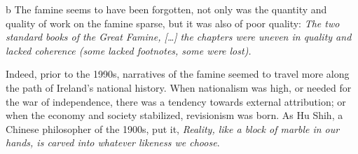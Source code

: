 \begin{table}[h]
\begin{threeparttable}
\begin{tablenotes}
			\vspace{7pt}

			\item[b] The famine seems to have been forgotten, not only was the quantity and quality of work on the famine sparse, but it was also of poor quality: \textit{The two standard books of the Great Famine, [\ldots] the chapters were uneven in quality and lacked coherence (some lacked footnotes, some were lost).} \citep{kinealy2017great}
		\end{tablenotes}
	\end{threeparttable}
\end{table}
\newpage
Indeed, prior to the 1990s, narratives of the famine seemed to travel more along the path of Ireland's national history. When nationalism was high, or needed for the war of independence, there was a tendency towards external attribution; or when the economy and society stabilized, revisionism was born. As Hu Shih, a Chinese philosopher of the 1900s, put it, \textit{Reality, like a block of marble in our hands, is carved into whatever likeness we choose}.



